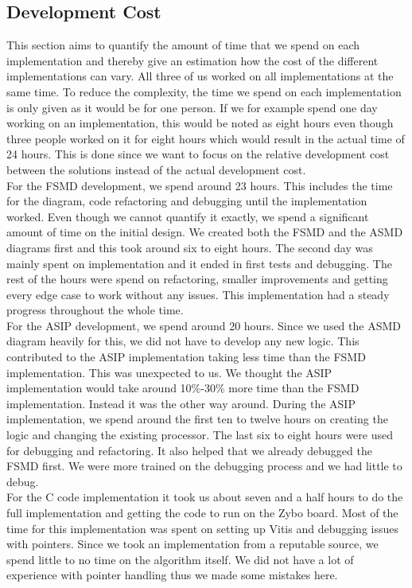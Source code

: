 \documentclass[conference]{IEEEtran}
\begin{document}
\subsection{Development Cost} \label{sec:devcost}
This section aims to quantify the amount of time that we spend on each implementation and thereby give an estimation how the cost of the different implementations can vary. All three of us worked on all implementations at the same time. To reduce the complexity, the time we spend on each implementation is only given as it would be for one person. If we for example spend one day working on an implementation, this would be noted as eight hours even though three people worked on it for eight hours which would result in the actual time of 24 hours. This is done since we want to focus on the relative development cost between the solutions instead of the actual development cost.\\
For the FSMD development, we spend around 23 hours. This includes the time for the diagram, code refactoring and debugging until the implementation worked. Even though we cannot quantify it exactly, we spend a significant amount of time on the initial design. We created both the FSMD and the ASMD diagrams first and this took around six to eight hours. The second day was mainly spent on implementation and it ended in first tests and debugging. The rest of the hours were spend on refactoring, smaller improvements and getting every edge case to work without any issues. This implementation had a steady progress throughout the whole time.\\
For the ASIP development, we spend around 20 hours. Since we used the ASMD diagram heavily for this, we did not have to develop any new logic. This contributed to the ASIP implementation taking less time than the FSMD implementation. This was unexpected to us. We thought the ASIP implementation would take around 10\%-30\% more time than the FSMD implementation. Instead it was the other way around. During the ASIP implementation, we spend around the first ten to twelve hours on creating the logic and changing the existing processor. The last six to eight hours were used for debugging and refactoring. It also helped that we already debugged the FSMD first. We were more trained on the debugging process and we had little to debug. \\
For the C code implementation it took us about seven and a half hours to do the full implementation and getting the code to run on the Zybo board. Most of the time for this implementation was spent on setting up Vitis and debugging issues with pointers. Since we took an implementation from a reputable source, we spend little to no time on the algorithm itself. We did not have a lot of experience with pointer handling thus we made some mistakes here.\\
\end{document}

